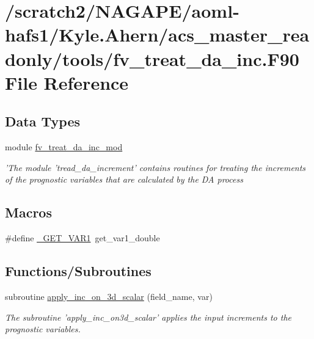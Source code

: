 \section{/scratch2/\-N\-A\-G\-A\-P\-E/aoml-\/hafs1/\-Kyle.Ahern/acs\-\_\-master\-\_\-readonly/tools/fv\-\_\-treat\-\_\-da\-\_\-inc.F90 File Reference}
\label{fv__treat__da__inc_8F90}
\subsection*{Data Types}
\begin{DoxyCompactItemize}
\item 
module \hyperlink{classfv__treat__da__inc__mod}{fv\-\_\-treat\-\_\-da\-\_\-inc\-\_\-mod}
\begin{DoxyCompactList}\small\item\em 'The module 'tread\-\_\-da\-\_\-increment' contains routines for treating the increments of the prognostic variables that are calculated by the D\-A process \end{DoxyCompactList}\end{DoxyCompactItemize}
\subsection*{Macros}
\begin{DoxyCompactItemize}
\item 
\#define \hyperlink{fv__treat__da__inc_8F90_aa573d7adaa945bb61ee4d9ca00756c63}{\-\_\-\-G\-E\-T\-\_\-\-V\-A\-R1}~get\-\_\-var1\-\_\-double
\end{DoxyCompactItemize}
\subsection*{Functions/\-Subroutines}
\begin{DoxyCompactItemize}
\item 
subroutine \hyperlink{fv__treat__da__inc_8F90_a54490bfdf02ea24f417cd322ecc4b615}{apply\-\_\-inc\-\_\-on\-\_\-3d\-\_\-scalar} (field\-\_\-name, var)
\begin{DoxyCompactList}\small\item\em The subroutine 'apply\-\_\-inc\-\_\-on3d\-\_\-scalar' applies the input increments to the prognostic variables. \end{DoxyCompactList}\end{DoxyCompactItemize}


